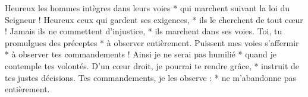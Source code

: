 Heureux les hommes intègres dans leurs voies *
qui marchent suivant la loi du Seigneur !
\versseparator
Heureux ceux qui gardent ses exigences, *
ils le cherchent de tout cœur !
\versseparator
Jamais ils ne commettent d’injustice, *
ils marchent dans ses voies.
\versseparator
Toi, tu promulgues des préceptes *
à observer entièrement.
\versseparator
Puissent mes voies s’affermir *
à observer tes commandements !
\versseparator
Ainsi je ne serai pas humilié *
quand je contemple tes volontés.
\versseparator
D’un cœur droit, je pourrai te rendre grâce, *
instruit de tes justes décisions.
\versseparator
Tes commandements, je les observe : *
ne m’abandonne pas entièrement.
